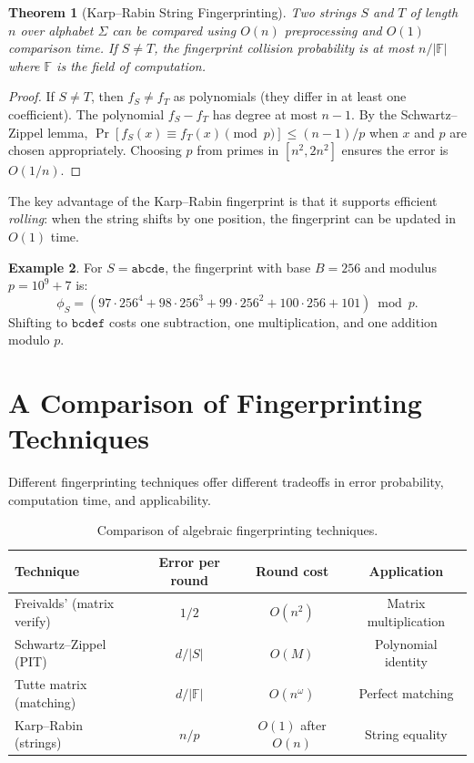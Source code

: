 \documentclass[twoside,12pt]{book}
\theoremstyle{plain}
\newtheorem{theorem}{Theorem}[chapter]
\theoremstyle{definition}
\newtheorem{example}[theorem]{Example}
\theoremstyle{remark}
\begin{document}
\begin{theorem}[Karp--Rabin String Fingerprinting]
\label{thm:kr-fingerprint}
Two strings $S$ and $T$ of length $n$ over alphabet $\Sigma$ can be compared using $O(n)$ preprocessing and $O(1)$ comparison time. If $S \neq T$, the fingerprint collision probability is at most $n/|\mathbb{F}|$ where $\mathbb{F}$ is the field of computation.
\end{theorem}

\begin{proof}
If $S \neq T$, then $f_S \neq f_T$ as polynomials (they differ in at least one coefficient). The polynomial $f_S - f_T$ has degree at most $n - 1$. By the Schwartz--Zippel lemma, $\Pr[f_S(x) \equiv f_T(x) \pmod{p}] \leq (n-1)/p$ when $x$ and $p$ are chosen appropriately. Choosing $p$ from primes in $[n^2, 2n^2]$ ensures the error is $O(1/n)$.
\end{proof}

The key advantage of the Karp--Rabin fingerprint is that it supports efficient \emph{rolling}: when the string shifts by one position, the fingerprint can be updated in $O(1)$ time.

\begin{example}
For $S = \texttt{abcde}$, the fingerprint with base $B = 256$ and modulus $p = 10^9 + 7$ is:
\[
\phi_S = (97 \cdot 256^4 + 98 \cdot 256^3 + 99 \cdot 256^2 + 100 \cdot 256 + 101) \bmod p.
\]
Shifting to $\texttt{bcdef}$ costs one subtraction, one multiplication, and one addition modulo $p$.
\end{example}


\section{A Comparison of Fingerprinting Techniques}
\label{sec:fingerprint-comparison}

Different fingerprinting techniques offer different tradeoffs in error probability, computation time, and applicability.

\begin{table}[H]
\centering
\caption{Comparison of algebraic fingerprinting techniques.}
\label{tab:fingerprint-comparison}
\begin{tabular}{@{}lccc@{}}
\toprule
\textbf{Technique} & \textbf{Error per round} & \textbf{Round cost} & \textbf{Application} \\
\midrule
Freivalds' (matrix verify) & $1/2$ & $O(n^2)$ & Matrix multiplication \\
Schwartz--Zippel (PIT) & $d/|S|$ & $O(M)$ & Polynomial identity \\
Tutte matrix (matching) & $d/|\mathbb{F}|$ & $O(n^\omega)$ & Perfect matching \\
Karp--Rabin (strings) & $n/p$ & $O(1)$ after $O(n)$ & String equality \\
\bottomrule
\end{tabular}
\end{table}
\end{document}

